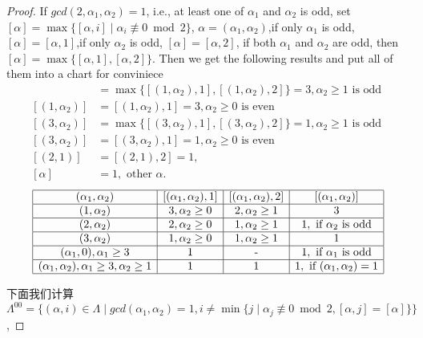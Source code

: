 \begin{proof}

If $gcd(2,\alpha_1,\alpha_2)=1$, i.e., at least one of $\alpha_1$ and $\alpha_2$ is odd, set $[\alpha]=\max\{[\alpha,i]\mid  \alpha_i  \not\equiv 0 \bmod 2\}$, $\alpha=(\alpha_1,\alpha_2)$,if only $\alpha_1$ is odd, $[\alpha]=[\alpha,1]$,if only $\alpha_2$ is odd, $[\alpha]=[\alpha,2]$, if both $\alpha_1$ and $\alpha_2$ are odd, then $[\alpha]=\max\{[\alpha,1],[\alpha,2]\}$. Then we get the following results and put all of them into a chart for conviniece
\begin{align*}
[(1,\alpha_2)]&=\max\{[(1,\alpha_2),1],[(1,\alpha_2),2]\}=3, \text{$\alpha_2 \geq 1$ is odd }\\
[(1,\alpha_2)]&=[(1,\alpha_2),1]=3, \text{$\alpha_2 \geq 0$ is even}\\
[(3,\alpha_2)]&=\max\{[(3,\alpha_2),1],[(3,\alpha_2),2]\}=1,\text{$\alpha_2\geq 1$ is odd }\\
[(3,\alpha_2)]&=[(3,\alpha_2),1]=1,\text{$\alpha_2\geq 0$ is even}\\
[(2,1)]&=[(2,1),2]=1,\\
[\alpha]&=1,\text{ other $\alpha$.}
\end{align*}
\[\begin{array}{|c|c|c|c|}
\hline
(\alpha_1,\alpha_2) & [(\alpha_1,\alpha_2),1] &[(\alpha_1,\alpha_2),2] &[(\alpha_1,\alpha_2)]  \\
\hline
(1,\alpha_2)  & 3, \alpha_2 \geq 0& 2 , \alpha_2\geq 1 & 3 \\
\hline
(2,\alpha_2)  & 2, \alpha_2 \geq 0& 1 , \alpha_2\geq 1 & 1, \text{ if $\alpha_2$ is odd} \\
\hline
(3,\alpha_2)  & 1, \alpha_2 \geq 0& 1 , \alpha_2\geq 1 & 1 \\
\hline
(\alpha_1,0),\alpha_1 \geq 3 & 1 & \text{-} &1, \text{ if $\alpha_1$ is odd} \\
\hline
(\alpha_1,\alpha_2),\alpha_1 \geq 3, \alpha_2 \geq 1& 1 & 1& 1, \text{ if $(\alpha_1,\alpha_2)=1$} \\
\hline
\end{array}\]


下面我们计算$\Lambda^{00}=\big\{(\alpha,i)\in \Lambda\mid  gcd(\alpha_1,\alpha_2)=1, i\neq \min\{j\mid \alpha_j\not\equiv 0 \bmod 2,[\alpha,j]=[\alpha]\} \big\}$, 


\end{proof}
